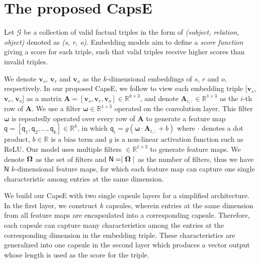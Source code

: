 \documentclass[11pt,a4paper]{article}
\begin{document}
\section{The proposed CapsE}
\label{sec:ourmodel}

Let $\mathcal{G}$ be a collection of valid factual triples in the form of \textit{(subject, relation, object)} denoted as \textit{(s, r, o)}. 
Embedding models aim to define a \textit{score function} giving a score for each triple, such that valid triples receive higher scores than invalid triples.

We denote $\boldsymbol{v}_s$, $\boldsymbol{v}_r$ and $\boldsymbol{v}_o$ as the $k$-dimensional embeddings of $s$, $r$ and $o$, respectively.
In our proposed CapsE, we follow \citet{Nguyen2018} to view each embedding triple [$\boldsymbol{v}_s$, $\boldsymbol{v}_r$, $\boldsymbol{v}_o$] as a matrix $\boldsymbol{A} = [\boldsymbol{v}_s,\boldsymbol{v}_r,\boldsymbol{v}_o] \in \mathbb{R}^{k\times3}$, and denote $\boldsymbol{A}_{i,:} \in \mathbb{R}^{1\times3}$ as the $i$-th row of $\boldsymbol{A}$. 
We use a filter $\boldsymbol{\omega} \in \mathbb{R}^{1\times3}$ operated on the convolution layer.
This filter $\boldsymbol{\omega}$ is repeatedly operated over every row of $\boldsymbol{A}$ to generate a feature map $\boldsymbol{\mathsf{q}} = [\mathsf{q}_1, \mathsf{q}_2, ..., \mathsf{q}_k] \in \mathbb{R}^{k}$, in which
$\mathsf{q}_i = g\left(\boldsymbol{\omega} \cdot{\boldsymbol{A}_{i,:}} + b\right)$ where $\cdot$ denotes a dot product, 
$b \in \mathbb{R}$ is a bias term and $g$ is a non-linear activation function such as ReLU. 
Our model uses multiple filters $\in \mathbb{R}^{1\times3}$ to generate feature maps. 
We denote $\bold{\Omega}$ as the set of filters and $\mathsf{N} = \mid\bold{\Omega}\mid$ as the number of filters, thus we have $\mathsf{N}$ $k$-dimensional feature maps, for which each feature map can capture one single characteristic among entries at the same dimension.

We build our CapsE with two single capsule layers for a simplified architecture.
In the first layer, we construct $k$ capsules, wherein entries at the same dimension from all feature maps are encapsulated into a corresponding capsule. 
Therefore, each capsule can capture many characteristics among the entries at the corresponding dimension in the embedding triple. 
These characteristics are generalized into one capsule in the second layer which produces a vector output whose length is used as the score for the triple.
\end{document}
